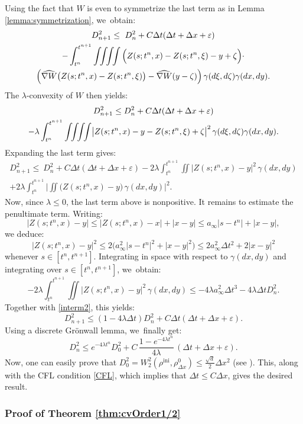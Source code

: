 \documentclass[JEP,XML,SOM,Unicode, NoFloatCountersInSection,published]{cedram}
\newcommand{\ini}{\mathrm{ini}}
\def\intquad {\int\mbox{\hspace{-2mm}}\int\mbox{\hspace{-2mm}}\int\mbox{\hspace{-2mm}}\int}
\def\eps{\varepsilon}
\def\dt{\Delta t}
\def\dx{\Delta x}
\def\nabWchapo{\widehat{\nabla W}}
\theoremstyle{plain}
\theoremstyle{definition}
\begin{document}
Using the fact that $W$ is even to symmetrize the last term as in Lemma \ref{lemma:symmetrization}, we~obtain:
\begin{multline*}
D_{n+1}^2 \leq \ D_n^2 + C \dt(\dt+\dx+\eps) \\
- \int_{t^n}^{t^{n+1}}\intquad\Big( Z(s;t^n,x)-Z(s;t^n,\xi)-y+\zeta \Big) \cdot \\
\Big(\nabWchapo\bigl(Z(s;t^n,x)-Z(s;t^n,\xi)\bigr)-\nabWchapo(y-\zeta)\Big) \, \gamma(d\xi,d\zeta) \gamma(dx,dy).
\end{multline*}
The $\lambda$-convexity of $W$ then yields:
\begin{multline*}
D_{n+1}^2 \leq D_n^2 + C \dt(\dt+\dx+\eps) \\
- \lambda \int_{t^n}^{t^{n+1}}\intquad \bigl|Z(s;t^n,x)-y-Z(s;t^n,\xi)+\zeta\bigr|^2
\, \gamma(d\xi,d\zeta) \gamma(dx,dy).
\end{multline*}
Expanding the last term gives:
\begin{multline}\label{interm2}
D_{n+1}^2 \leq \ D_n^2 + C \dt(\dt+\dx+\eps)
- 2\lambda \int_{t^n}^{t^{n+1}} \iint \bigl|Z(s;t^n,x)-y\bigr|^2
\,\gamma(dx,dy) \\
+ 2\lambda \int_{t^n}^{t^{n+1}} \biggl\vert \iint \bigl(Z(s;t^n,x)-y\bigr)
\,\gamma(dx,dy) \biggr\vert^2. 
\end{multline}
Now, since $\lambda \leq 0$, the last term above is nonpositive. It remains to estimate the penultimate term. Writing:
\[
\bigl|Z(s;t^n,x)-y\bigr| \leq \bigl|Z(s;t^n,x)-x\bigr| + \bigl|x-y\bigr| \leq a_\infty\bigl|s-t^n\bigr| + \bigl|x-y\bigr|,
\]
we deduce:
\[
\bigl|Z(s;t^n,x)-y\bigr|^2 \leq 2\big(a_\infty^2\bigl|s-t^n\bigr|^2 + \bigl|x-y\bigr|^2\big) \leq 2a_\infty^2 \dt^2 + 2\bigl|x-y\bigr|^2
\]
whenever $s \in [t^n, t^{n+1}]$. Integrating in space with respect to $\gamma(dx, dy)$ and integrating over $s \in [t^n, t^{n+1}]$, we~obtain:
\[
- 2\lambda \int_{t^n}^{t^{n+1}} \iint \bigl|Z(s;t^n,x)-y\bigr|^2
\,\gamma(dx,dy) \leq -4\lambda a_\infty^2 \dt^3 -4\lambda \dt D_n^2.
\]
Together with \eqref{interm2}, this yields:
\[
D_{n+1}^2 \leq (1-4\lambda\dt)D_n^2 + C \dt(\dt+\dx+\eps).
\]
Using a discrete Grönwall lemma, we~finally get:
\[
D_n^2 \leq e^{-4\lambda t^n} D_0^2 + C\, \frac{1 - e^{-4\lambda t^n} }{4\lambda}\, (\dt+\dx+\eps).
\]
Now, one can easily prove that $D_0^2 = W_2^2(\rho^{\ini}, \rho_{\dx}^0) \leq \frac{\sqrt{d}}{2} \dx^2$ (see \cite{dlv17}). This, along with the CFL condition \eqref{CFL}, which implies that $\dt \leq C\dx$, gives the desired result.

\subsubsection{Proof of Theorem \ref{thm:cvOrder1/2}}
\end{document}
